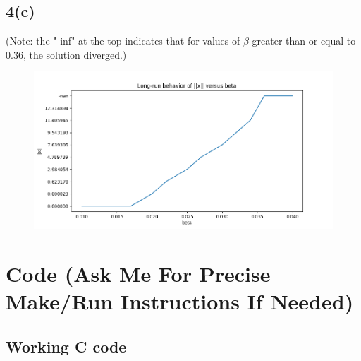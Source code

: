 \documentclass[]{article}
\begin{document}
	\subsection*{4(c)} (Note: the "-inf" at the top indicates that for values of $\beta$ greater than or equal to $0.36$, the solution diverged.)
\begin{figure}[H]
	\includegraphics[scale=0.5]{hw4p4}
	\label{fig:hw4p4}
\end{figure}

\section*{Code (Ask Me For Precise Make/Run Instructions If Needed)}
\subsection*{Working C code}
\end{document}
